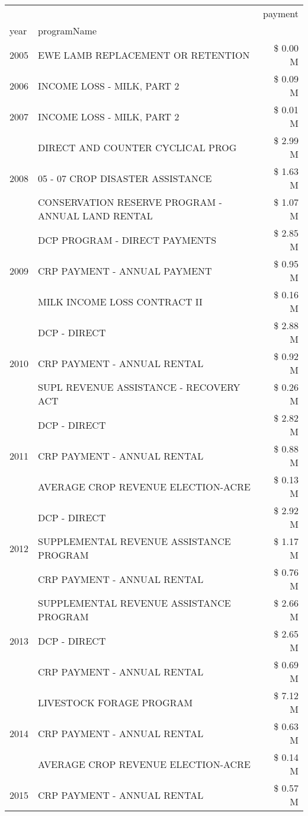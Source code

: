 \begin{tabular}{llr}
\toprule
 &  & payment \\
year & programName &  \\
\midrule
2005 & EWE LAMB REPLACEMENT OR RETENTION & \$ 0.00 M \\
\cline{1-3}
2006 & INCOME LOSS - MILK, PART 2 & \$ 0.09 M \\
\cline{1-3}
2007 & INCOME LOSS - MILK, PART 2 & \$ 0.01 M \\
\cline{1-3}
\multirow[t]{3}{*}{2008} & DIRECT AND COUNTER CYCLICAL PROG & \$ 2.99 M \\
 & 05 - 07 CROP DISASTER ASSISTANCE & \$ 1.63 M \\
 & CONSERVATION RESERVE PROGRAM - ANNUAL LAND RENTAL & \$ 1.07 M \\
\cline{1-3}
\multirow[t]{3}{*}{2009} & DCP PROGRAM - DIRECT PAYMENTS & \$ 2.85 M \\
 & CRP PAYMENT - ANNUAL PAYMENT & \$ 0.95 M \\
 & MILK INCOME LOSS CONTRACT II & \$ 0.16 M \\
\cline{1-3}
\multirow[t]{3}{*}{2010} & DCP - DIRECT & \$ 2.88 M \\
 & CRP PAYMENT - ANNUAL RENTAL & \$ 0.92 M \\
 & SUPL REVENUE ASSISTANCE - RECOVERY ACT & \$ 0.26 M \\
\cline{1-3}
\multirow[t]{3}{*}{2011} & DCP - DIRECT & \$ 2.82 M \\
 & CRP PAYMENT - ANNUAL RENTAL & \$ 0.88 M \\
 & AVERAGE CROP REVENUE ELECTION-ACRE & \$ 0.13 M \\
\cline{1-3}
\multirow[t]{3}{*}{2012} & DCP - DIRECT & \$ 2.92 M \\
 & SUPPLEMENTAL REVENUE ASSISTANCE PROGRAM & \$ 1.17 M \\
 & CRP PAYMENT - ANNUAL RENTAL & \$ 0.76 M \\
\cline{1-3}
\multirow[t]{3}{*}{2013} & SUPPLEMENTAL REVENUE ASSISTANCE PROGRAM & \$ 2.66 M \\
 & DCP - DIRECT & \$ 2.65 M \\
 & CRP PAYMENT - ANNUAL RENTAL & \$ 0.69 M \\
\cline{1-3}
\multirow[t]{3}{*}{2014} & LIVESTOCK FORAGE PROGRAM & \$ 7.12 M \\
 & CRP PAYMENT - ANNUAL RENTAL & \$ 0.63 M \\
 & AVERAGE CROP REVENUE ELECTION-ACRE & \$ 0.14 M \\
\cline{1-3}
\multirow[t]{3}{*}{2015} & CRP PAYMENT - ANNUAL RENTAL & \$ 0.57 M \\

\end{tabular}
